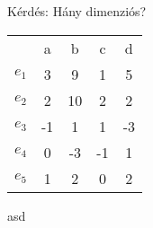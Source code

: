	
	
	
	\begin{frame}
		\begin{tcolorbox}[title={Bázistranzformáció}]
			Kérdés: Hány dimenziós?\\
			
			 \begin{center}
			\begin{tabular}{ c|c c c c } 
			 \hline
			  & a & b & c & d \\ 
			 ${e_1}$ & 3 & 9 & 1 & 5 \\ 
			 ${e_2}$ & 2 & 10 & 2 & 2 \\ 
			 ${e_3}$ & -1 & 1 & 1 & -3 \\ 
			 ${e_4}$ & 0 & -3 & -1 & 1 \\ 
			 ${e_5}$ & 1 & 2 & 0 & 2 \\ 
			 \hline
			\end{tabular}
			\end{center}
			\mmedskip
			
			asd
		\end{tcolorbox}
	\end{frame}


